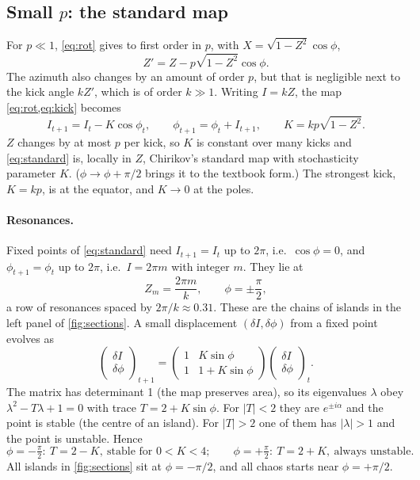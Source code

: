 \documentclass[11pt,a4paper]{article}
\begin{document}
\subsection{Small \texorpdfstring{$p$}{p}: the standard map}\label{sec:standard}

For $p\ll1$, \cref{eq:rot} gives to first order in $p$, with $X=\sqrt{1-Z^2}\cos\phi$,
\begin{equation}
  Z' = Z - p\sqrt{1-Z^2}\cos\phi .
\end{equation}
The azimuth also changes by an amount of order $p$, but that is negligible next to the kick angle $kZ'$, which is of
order $k\gg1$. Writing $I=kZ$, the map \cref{eq:rot,eq:kick} becomes
\begin{equation}\label{eq:standard}
  I_{t+1} = I_t - K\cos\phi_t,\qquad \phi_{t+1} = \phi_t + I_{t+1},\qquad K = kp\sqrt{1-Z^2}.
\end{equation}
$Z$ changes by at most $p$ per kick, so $K$ is constant over many kicks and \cref{eq:standard} is, locally in $Z$,
Chirikov's standard map with stochasticity parameter $K$. ($\phi\to\phi+\pi/2$ brings it to the textbook form.) The
strongest kick, $K=kp$, is at the equator, and $K\to0$ at the poles.

\paragraph{Resonances.}
Fixed points of \cref{eq:standard} need $I_{t+1}=I_t$ up to $2\pi$, i.e.\ $\cos\phi=0$, and $\phi_{t+1}=\phi_t$ up to
$2\pi$, i.e.\ $I=2\pi m$ with integer $m$. They lie at
\begin{equation}\label{eq:res}
  Z_m = \frac{2\pi m}{k},\qquad \phi = \pm\frac{\pi}{2},
\end{equation}
a row of resonances spaced by $2\pi/k\approx0.31$. These are the chains of islands in the left panel of
\cref{fig:sections}. A small displacement $(\delta I,\delta\phi)$ from a fixed point evolves as
\begin{equation}
  \begin{pmatrix}\delta I\\ \delta\phi\end{pmatrix}_{t+1} =
  \begin{pmatrix}1 & K\sin\phi\\ 1 & 1+K\sin\phi\end{pmatrix}
  \begin{pmatrix}\delta I\\ \delta\phi\end{pmatrix}_{t}.
\end{equation}
The matrix has determinant 1 (the map preserves area), so its eigenvalues $\lambda$ obey $\lambda^2-T\lambda+1=0$ with
trace $T = 2+K\sin\phi$. For $|T|<2$ they are $e^{\pm i\alpha}$ and the point is stable (the centre of an island). For
$|T|>2$ one of them has $|\lambda|>1$ and the point is unstable. Hence
\begin{equation}
  \phi=-\tfrac{\pi}{2}:\ T=2-K,\ \text{stable for } 0<K<4;\qquad
  \phi=+\tfrac{\pi}{2}:\ T=2+K,\ \text{always unstable}.
\end{equation}
All islands in \cref{fig:sections} sit at $\phi=-\pi/2$, and all chaos starts near $\phi=+\pi/2$.
\end{document}
